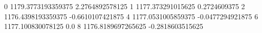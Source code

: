 0 1179.3773193359375 2.2764892578125
1 1177.373291015625 0.2724609375
2 1176.4398193359375 -0.6610107421875
4 1177.0531005859375 -0.0477294921875
6 1177.100830078125 0.0
8 1176.8189697265625 -0.2818603515625
